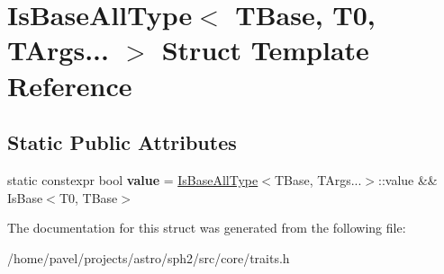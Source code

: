 \hypertarget{structIsBaseAllType_3_01TBase_00_01T0_00_01TArgs_8_8_8_01_4}{}\section{Is\+Base\+All\+Type$<$ T\+Base, T0, T\+Args... $>$ Struct Template Reference}
\label{structIsBaseAllType_3_01TBase_00_01T0_00_01TArgs_8_8_8_01_4}
\subsection*{Static Public Attributes}
\begin{DoxyCompactItemize}
\item 
\hypertarget{structIsBaseAllType_3_01TBase_00_01T0_00_01TArgs_8_8_8_01_4_acf2b6f6acfecbbb4327fe2e22a132935}{}\label{structIsBaseAllType_3_01TBase_00_01T0_00_01TArgs_8_8_8_01_4_acf2b6f6acfecbbb4327fe2e22a132935} 
static constexpr bool {\bfseries value} = \hyperlink{structIsBaseAllType}{Is\+Base\+All\+Type}$<$T\+Base, T\+Args...$>$\+::value \&\& Is\+Base$<$T0, T\+Base$>$
\end{DoxyCompactItemize}


The documentation for this struct was generated from the following file\+:\begin{DoxyCompactItemize}
\item 
/home/pavel/projects/astro/sph2/src/core/traits.\+h\end{DoxyCompactItemize}
